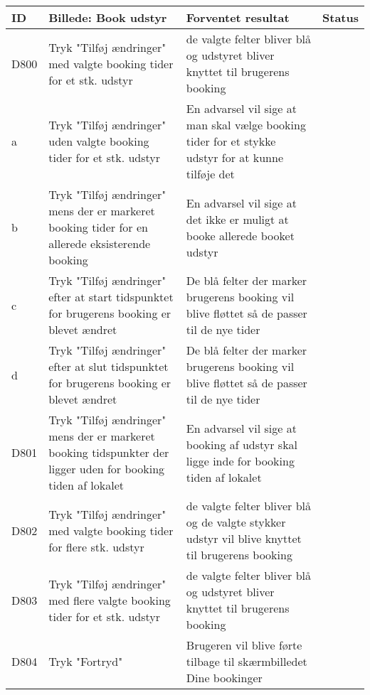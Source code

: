 \begin{tabularx}{\textwidth}{ |X|X|X|X| }
\hline
	ID & Billede: Book udstyr  & Forventet resultat & Status\\ 
\hline
	D800 & Tryk "Tilføj ændringer" med valgte booking tider for et stk. udstyr & de valgte felter bliver blå og udstyret bliver knyttet til brugerens booking & \\
\hline
	a & Tryk "Tilføj ændringer" uden valgte booking tider for et stk. udstyr & En advarsel vil sige at man skal vælge booking tider for et stykke udstyr for at kunne tilføje det & \\
\hline
	b & Tryk "Tilføj ændringer" mens der er markeret booking tider for en allerede eksisterende booking & En advarsel vil sige at det ikke er muligt at booke allerede booket udstyr & \\
\hline
	c & Tryk "Tilføj ændringer" efter at start tidspunktet for brugerens booking er blevet ændret & De blå felter der marker brugerens booking vil blive fløttet så de passer til de nye tider & \\
\hline
	d & Tryk "Tilføj ændringer" efter at slut tidspunktet for brugerens booking er blevet ændret & De blå felter der marker brugerens booking vil blive fløttet så de passer til de nye tider & \\
\hline
	D801 & Tryk "Tilføj ændringer" mens der er markeret booking tidspunkter der ligger uden for booking tiden af lokalet & En advarsel vil sige at booking af udstyr skal ligge inde for booking tiden af lokalet & \\
\hline
	D802 & Tryk "Tilføj ændringer" med valgte booking tider for flere stk. udstyr & de valgte felter bliver blå og de valgte stykker udstyr vil blive knyttet til brugerens booking & \\
\hline
	D803 & Tryk "Tilføj ændringer" med flere valgte booking tider for et stk. udstyr & de valgte felter bliver blå og udstyret bliver knyttet til brugerens booking & \\
\hline
	D804 & Tryk "Fortryd" & Brugeren vil blive førte tilbage til skærmbilledet Dine bookinger & \\
\hline
\end{tabularx}

